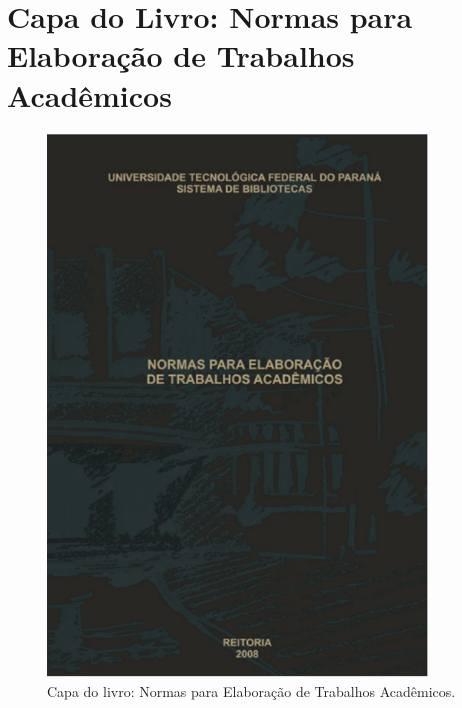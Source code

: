 
\chapter{Capa do Livro: Normas para Elaboração de Trabalhos Acadêmicos}\label{cap:anexob}

\begin{figure}[htb]%
\captionsetup{width=0.9\textwidth}%
\caption{Capa do livro: Normas para Elaboração de Trabalhos Acadêmicos.}%
\label{fig:capadolivro}%
\includegraphics[width=0.9\textwidth]{./PosTexto/Ilustracoes/capa-livro}%
\end{figure}
